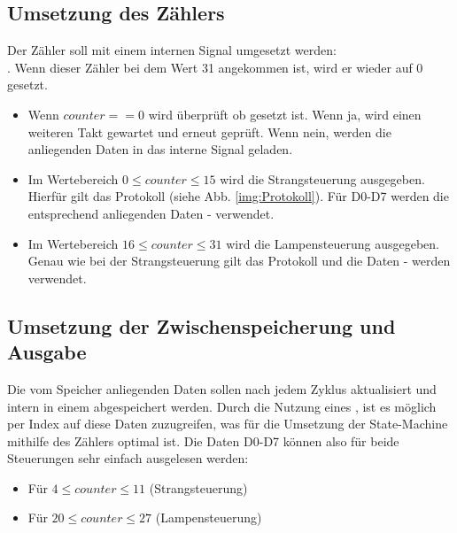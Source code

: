 \documentclass{article}
\begin{document}
  \subsection{Umsetzung des Zählers}
    Der Zähler soll mit einem internen Signal umgesetzt werden: \\.
    Wenn dieser Zähler bei dem Wert 31 angekommen ist, wird er wieder auf 0 gesetzt.

    \begin{itemize}
      \item Wenn $counter == 0$ wird überprüft ob  gesetzt ist. Wenn ja, wird einen weiteren Takt gewartet und erneut geprüft. Wenn nein, werden die anliegenden Daten in das interne Signal  geladen.
      \item Im Wertebereich $0 \leq counter \leq 15$ wird die Strangsteuerung ausgegeben. Hierfür gilt das Protokoll (siehe Abb. \ref{img:Protokoll}). Für D0-D7 werden die entsprechend anliegenden Daten - verwendet.
      \item Im Wertebereich $16 \leq counter \leq 31$ wird die Lampensteuerung ausgegeben. Genau wie bei der Strangsteuerung gilt das Protokoll und die Daten - werden verwendet.
    \end{itemize}

  \subsection{Umsetzung der Zwischenspeicherung und Ausgabe}
    \label{subsec:datahandling}
    Die vom Speicher anliegenden Daten sollen nach jedem Zyklus aktualisiert und intern in einem  abgespeichert werden.
    Durch die Nutzung eines , ist es möglich per Index auf diese Daten zuzugreifen, was für die Umsetzung der State-Machine mithilfe des Zählers optimal ist.
    Die Daten D0-D7 können also für beide Steuerungen sehr einfach ausgelesen werden:
    \begin{itemize}

      \item Für $4 \leq counter \leq 11$ (Strangsteuerung) 
      \item Für $20 \leq counter \leq 27$ (Lampensteuerung) 
    \end{itemize}
\end{document}
